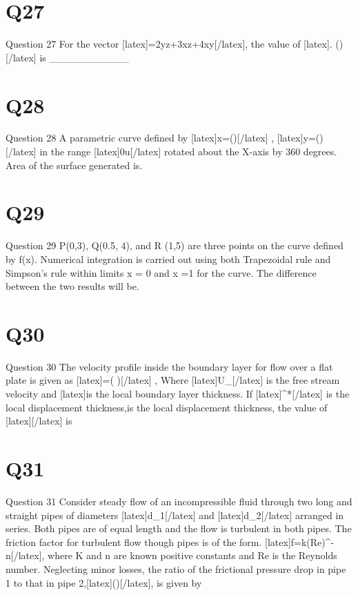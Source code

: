 \section*{Q27}
Question 27 For the vector [latex]=\textrm{2yz}+\textrm{3xz}+4\textrm{xy}[/latex], the value of [latex]\triangledown.  (\triangledown \times {})[/latex]  is \_\_\_\_\_\_\_\_\_\_\_

\section*{Q28}
Question 28 A parametric curve defined by  [latex]x=\cos ()[/latex] , [latex]y=\sin ()[/latex]  in the range [latex]0\leq u[/latex]  rotated about the X-axis by 360 degrees. Area of the surface generated is.

\section*{Q29}
Question 29 P(0,3), Q(0.5, 4), and R (1,5) are three points on the curve defined by f(x). Numerical integration is carried out using both Trapezoidal rule and Simpson's rule within limits x = 0 and x =1 for the curve. The difference between the two results will be.

\section*{Q30}
Question 30 The velocity profile inside the boundary layer for flow over a flat plate is given as [latex]=\sin (  )[/latex] , Where [latex]U\_{\infty}[/latex] is the free stream velocity and  [latex]\delta[/latex]  is the local boundary layer thickness. If [latex]\delta ^{*}[/latex] is the local displacement thickness,is the local displacement thickness, the value of  [latex]\frac{\delta ^{*}}{\delta }[/latex]  is

\section*{Q31}
Question 31 Consider steady flow of an incompressible fluid through two long and straight pipes of diameters [latex]d\_{1}[/latex]  and [latex]d\_{2}[/latex]  arranged in series. Both pipes are of equal length and the flow is turbulent in both pipes. The friction factor for turbulent flow though pipes is of the form. [latex]f=k(Re)^{-n}[/latex], where K and n are known positive constants and Re is the Reynolds number. Neglecting minor losses, the ratio of the frictional pressure drop in pipe 1 to that in pipe 2,[latex]()[/latex], is given by

